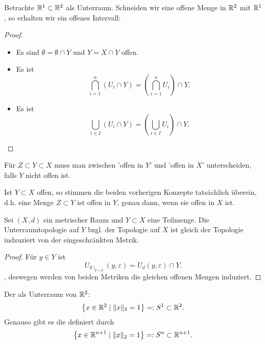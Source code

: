 \begin{example}
    Betrachte $\mathbb{R}^1 \subset \mathbb{R}^2$ als Unterraum. Schneiden wir eine offene Menge in $\mathbb{R}^2$ mit $\mathbb{R}^1$, so erhalten wir ein offenes Intervall: \\
\begin{minipage}{\textwidth}
\centering    
\end{minipage}
\end{example}
\begin{proof}
    \begin{itemize}
        \item Es sind $\emptyset = \emptyset \cap Y$ und $Y = X \cap Y$ offen.
        \item Es ist 
            \[
                \bigcap_{i=1}^n \left( U_i \cap Y \right)  = \left( \bigcap_{i=1}^n U_i \right)  \cap Y
            .\] 
        \item Es ist
            \[
                \bigcup_{i\in I} \left( U_i \cap Y \right) = \left( \bigcup_{i \in  I} U_i \right) \cap Y
            .\] 
    \end{itemize}
\end{proof}
\begin{warning}
    Für $Z\subset Y\subset X$ muss man zwischen 'offen in $Y$' und  'offen in  $X$' unterscheiden, falls  $Y$ nicht offen ist.
\end{warning}
\begin{remark*}
    Ist $Y\subset X$ offen, so stimmen die beiden vorherigen Konzepte tatsächlich überein, d.h. eine Menge $Z\subset Y$ ist offen in $Y$, genau dann, wenn sie offen in  $X$ ist.
\end{remark*}

\begin{remark}
    Sei $(X,d)$ ein metrischer Raum und  $Y\subset X$ eine Teilmenge. Die Unterraumtopologie auf $Y$ bzgl. der Topologie auf  $X$ ist gleich der Topologie indzuziert von der eingeschränkten Metrik.
\end{remark}
\begin{proof}
    Für $y\in Y$ ist
    \[
        U_{d\mid _{Y\times Y}} (y,ε) = U_d(y,ε)\cap Y
    .\] 
    , deswegen werden von beiden Metriken die gleichen offenen Mengen induziert.
\end{proof}



\begin{example}
    Der  als Unterraum von $\mathbb{R}^2$:
    \[
    \left \{x\in \mathbb{R}^2 \mid  \lVert x \rVert _2 = 1\right\}  =: S^1 \subset \mathbb{R}^2
    .\] 
    Genauso gibt es die   definiert durch
    \[
    \left \{x\in \mathbb{R}^{n+1}\mid  \lVert x \rVert _2 = 1\right\} =: S^n \subset \mathbb{R}^{n+1}
    .\] 
\end{example}

